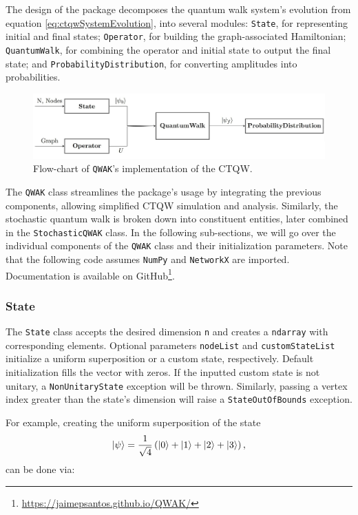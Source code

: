 \documentclass[main.tex]{subfiles}
\begin{document}
The design of the package decomposes the quantum walk system's evolution from
equation \eqref{eq:ctqwSystemEvolution}, into several modules: \texttt{State},
for representing initial and final states; \texttt{Operator}, for building the
graph-associated Hamiltonian; \texttt{QuantumWalk}, for combining the operator
and initial state to output the final state; and
\texttt{ProbabilityDistribution}, for converting amplitudes into probabilities.

\begin{figure}[!h]
    \centering
    \includegraphics[width=12cm]{img/QWAK/qwakDiagram.jpg}
    \caption{Flow-chart of \texttt{QWAK}'s implementation of the CTQW.}
    \label{fig:oriented_line}
\end{figure}

The \texttt{QWAK} class streamlines the package's usage by integrating the
previous components, allowing simplified CTQW simulation and analysis.
Similarly, the stochastic quantum walk is broken down into constituent
entities, later combined in the \texttt{StochasticQWAK} class. In the following
sub-sections, we will go over the individual components of the \texttt{QWAK}
class and their initialization parameters. Note that the following code assumes
\texttt{NumPy} and \texttt{NetworkX} are imported. Documentation is available
on GitHub\footnote{\url{https://jaimepsantos.github.io/QWAK/}}.

\subsubsection{State}

The \texttt{State} class accepts the desired dimension \texttt{n} and creates a
\texttt{ndarray} with corresponding elements. Optional parameters
\texttt{nodeList} and \texttt{customStateList} initialize a uniform
superposition or a custom state, respectively. Default initialization fills
the vector with zeros. If the inputted custom state is not unitary, a
\texttt{NonUnitaryState} exception will be thrown. Similarly, passing a vertex index
greater than the state's dimension will raise a \texttt{StateOutOfBounds}
exception.

For example, creating the uniform superposition of the state
\begin{equation}
    \ket{\psi} = \frac{1}{\sqrt{4}}\left( \ket{0} + \ket{1} +\ket{2} +\ket{3}\right),
\end{equation}
can be done via:
\end{document}
